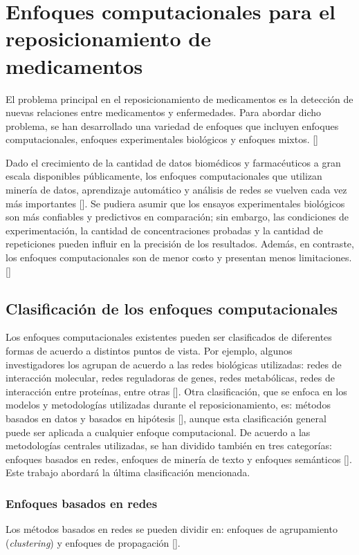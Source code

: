 \section{Enfoques computacionales para el reposicionamiento de medicamentos}

El problema principal en el reposicionamiento de medicamentos es la detección de nuevas relaciones entre medicamentos y enfermedades. Para abordar dicho problema, se han desarrollado una variedad de enfoques que incluyen enfoques computacionales, enfoques experimentales biológicos y enfoques mixtos. [\cite{hanqing}]

Dado el crecimiento de la cantidad de datos biomédicos y farmacéuticos a gran escala disponibles públicamente, los enfoques computacionales que utilizan minería de datos, aprendizaje automático y análisis de redes se vuelven cada vez más importantes [\cite{jarada}]. Se pudiera asumir que los ensayos experimentales biológicos son más confiables y predictivos en comparación; sin embargo, las condiciones de experimentación, la cantidad de concentraciones probadas y la cantidad de repeticiones pueden influir en la precisión de los resultados. Además, en contraste, los enfoques computacionales son de menor costo y presentan menos limitaciones. [\cite{oprea}]

\subsection{Clasificación de los enfoques computacionales}
Los enfoques computacionales existentes pueden ser clasificados de diferentes formas de acuerdo a distintos puntos de vista. Por ejemplo, algunos investigadores los agrupan de acuerdo a las redes biológicas utilizadas: redes de interacción molecular, redes reguladoras de genes, redes metabólicas, redes de interacción entre proteínas, entre otras [\cite{lotfi}]. Otra clasificación, que se enfoca en los modelos y metodologías utilizadas durante el reposicionamiento, es: métodos basados en datos y basados en hipótesis [\cite{zou}], aunque esta clasificación general puede ser aplicada a cualquier enfoque computacional. De acuerdo a las metodologías centrales utilizadas, se han dividido también en tres categorías: enfoques basados en redes, enfoques de minería de texto y enfoques semánticos [\cite{koromina}]. Este trabajo abordará la última clasificación mencionada.

\subsubsection{Enfoques basados en redes}
Los métodos basados en redes se pueden dividir en: enfoques de agrupamiento (\textit{clustering}) y enfoques de propagación [\cite{hanqing}].


